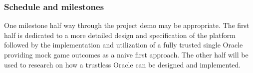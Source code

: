 \documentclass[a4paper, 10pt]{article}
\begin{document}
\subsubsection*{Schedule and milestones}

One milestone half way through the project demo may be appropriate.
The first half is dedicated to a more detailed design and specification of the platform followed by the implementation and utilization of a fully trusted single Oracle providing mock game outcomes as a naive first approach.
The other half will be used to research on how a trustless Oracle can be designed and implemented.
\end{document}

